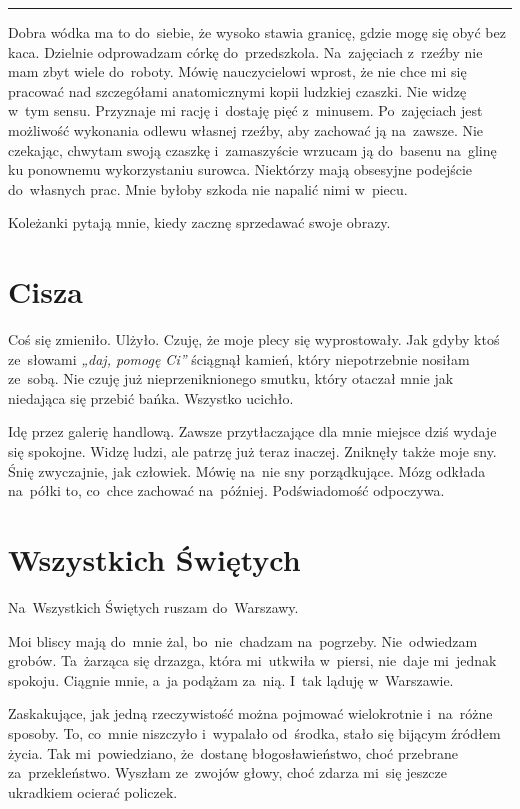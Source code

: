 \documentclass[9pt, a5paper]{memoir}
\begin{document}
\fancybreak{* \quad * \quad *}

Dobra wódka ma to do~siebie, że wysoko stawia granicę, gdzie mogę się obyć bez kaca. Dzielnie odprowadzam córkę do~przedszkola. Na~zajęciach z~rzeźby nie mam zbyt wiele do~roboty. Mówię nauczycielowi wprost, że nie chce mi się pracować nad szczegółami anatomicznymi kopii ludzkiej czaszki. Nie widzę w~tym sensu. Przyznaje mi rację i~dostaję pięć z~minusem. Po~zajęciach jest możliwość wykonania odlewu własnej rzeźby, aby zachować ją na~zawsze. Nie czekając, chwytam swoją czaszkę i~zamaszyście wrzucam ją do~basenu na~glinę ku ponownemu wykorzystaniu surowca. Niektórzy mają obsesyjne podejście do~własnych prac. Mnie byłoby szkoda nie napalić nimi w~piecu.

Koleżanki pytają mnie, kiedy zacznę sprzedawać swoje obrazy.


\newpage
\section{Cisza}
Coś się zmieniło. Ulżyło. Czuję, że moje plecy się wyprostowały. Jak gdyby ktoś ze~słowami \textit{„daj, pomogę Ci”} ściągnął kamień, który niepotrzebnie nosiłam ze~sobą. Nie czuję już nieprzeniknionego smutku, który otaczał mnie jak niedająca się przebić bańka. Wszystko ucichło.

Idę przez galerię handlową. Zawsze przytłaczające dla mnie miejsce dziś wydaje się spokojne. Widzę ludzi, ale patrzę już teraz inaczej. Zniknęły także moje sny. Śnię zwyczajnie, jak człowiek. Mówię na~nie sny porządkujące. Mózg odkłada na~półki to, co~chce zachować na~później. Podświadomość odpoczywa.

\newpage
\section{Wszystkich Świętych}
Na~Wszystkich Świętych ruszam do~Warszawy.

Moi bliscy mają do~mnie żal, bo~nie~chadzam na~pogrzeby. Nie~odwiedzam grobów. Ta~żarząca się drzazga, która mi~utkwiła w~piersi, nie~daje mi~jednak spokoju. Ciągnie mnie, a~ja podążam za~nią. I~tak ląduję w~Warszawie.

Zaskakujące, jak jedną rzeczywistość można pojmować wielokrotnie i~na~różne sposoby. To, co~mnie niszczyło i~wypalało od~środka, stało się bijącym źródłem życia. Tak mi~powiedziano, że~dostanę błogosławieństwo, choć przebrane za~przekleństwo. Wyszłam ze~zwojów głowy, choć zdarza mi~się jeszcze ukradkiem ocierać policzek.
\end{document}
